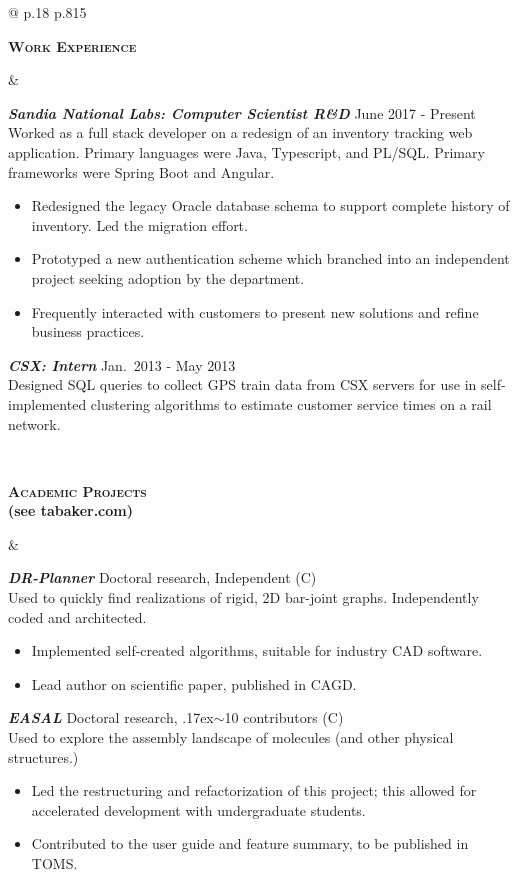 \documentclass[10pt]{article}
\def\mytilde{{\raise.17ex\hbox{$\scriptstyle\mathtt{\sim}$}}}
\def\cpp{{C\nolinebreak[4]\hspace{-.05em}\raisebox{.4ex}{\tiny\bf ++}}}
\newcommand{\titlecell}[1]{%
  \begin{minipage}[t]{\linewidth}
    \raggedleft \textbf{#1}
\end{minipage}}
\newcommand{\contentcell}[1]{%
  \begin{minipage}[t]{\linewidth}
    #1
\end{minipage}}
\newcommand{\tablerowskip}{\vspace{4.83mm} \\}
\newcommand{\projectskip}{\vspace{3mm}}
\newcommand{\contentcellheader}[1]{\textbf{\textsl{#1}}}
\begin{document}
\begin{tabular}{@{} p{.18\textwidth} p{.815\textwidth}}
          \titlecell{\textsc{Work Experience}} &
          \contentcell{
            \contentcellheader{Sandia National Labs: Computer Scientist R\&D} \hfill June 2017 - Present \\
            Worked as a full stack developer on a redesign of an inventory tracking web application. Primary languages were Java, Typescript, and PL/SQL. Primary frameworks were Spring Boot and Angular.
            \begin{itemize}[itemsep=0pt,topsep=0pt,leftmargin=*] \itemsep -2pt
            \item Redesigned the legacy Oracle database schema to support complete history of inventory. Led the migration effort.
            \item Prototyped a new authentication scheme which branched into an independent project seeking adoption by the department.
            \item Frequently interacted with customers to present new solutions and refine business practices.
            \end{itemize}
          }
          \projectskip

          \contentcell{
            \contentcellheader{CSX: Intern} \hfill Jan.\ 2013 - May 2013 \\
            Designed SQL queries to collect GPS train data from CSX servers for use in self-implemented clustering algorithms to estimate customer service times on a rail network.
          }
          \tablerowskip

          \titlecell{\textsc{Academic Projects} \\ {\small (see tabaker.com)}} &
          \contentcell{
            \contentcellheader{DR-Planner} \hfill Doctoral research, Independent (\cpp)
            \\ Used to quickly find realizations of rigid, 2D bar-joint graphs. Independently coded and architected.
            \begin{itemize}[itemsep=0pt,topsep=0pt,leftmargin=*] \itemsep -2pt
            \item Implemented self-created algorithms, suitable for industry CAD software.
            \item Lead author on scientific paper, published in CAGD.
            \end{itemize}
            \projectskip

            \contentcellheader{EASAL} \hfill Doctoral research, \mytilde 10 contributors (\cpp)
            \\ Used to explore the assembly landscape of molecules (and other physical structures.)
            \begin{itemize}[itemsep=0pt,topsep=0pt,leftmargin=*] \itemsep -2pt
            \item Led the restructuring and refactorization of this project; this allowed for accelerated development with undergraduate students.
            \item Contributed to the user guide and feature summary, to be published in TOMS.
            \end{itemize}
          }
          \tablerowskip


\end{tabular}
\end{document}
